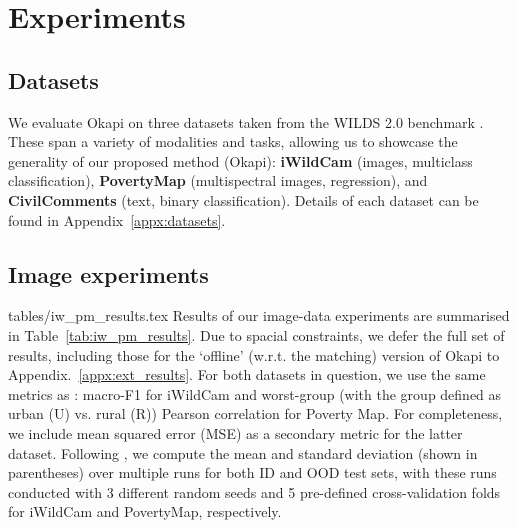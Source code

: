 \section{Experiments}\label{sec:exps}
%
\subsection{Datasets}\label{sec:exps_datasets} 
%
We evaluate Okapi on three datasets taken from the WILDS 2.0 benchmark \citep{SagWeiLeeGaoetal22}. 
%
These span a variety of modalities and tasks, allowing us to showcase the generality of our
proposed method (Okapi): \textbf{iWildCam} (images, multiclass classification), \textbf{PovertyMap}
(multispectral images, regression), and \textbf{CivilComments} (text, binary classification). 
%
Details of each dataset can be found in Appendix~\ref{appx:datasets}.
%
\subsection{Image experiments}
%
{tables/iw_pm_results.tex}
%
Results of our image-data experiments are summarised in Table~\ref{tab:iw_pm_results}. 
%
Due to spacial constraints, we defer the full set of results, including those for the `offline'
(w.r.t. the matching) version of Okapi to Appendix.~\ref{appx:ext_results}. 
%
For both datasets in question, we use the same metrics as \citet{SagWeiLeeGaoetal22}: macro-F1 for
iWildCam and worst-group (with the group defined as urban (U) vs. rural (R)) Pearson correlation
for Poverty Map. 
%
For completeness, we include mean squared error (MSE) as a secondary metric for the latter dataset.
%
Following \citet{SagWeiLeeGaoetal22}, we compute the mean and standard deviation (shown in
parentheses) over multiple runs for both ID and OOD test sets, with these runs conducted with 3
different random seeds and 5 pre-defined cross-validation folds for iWildCam and PovertyMap,
respectively.

